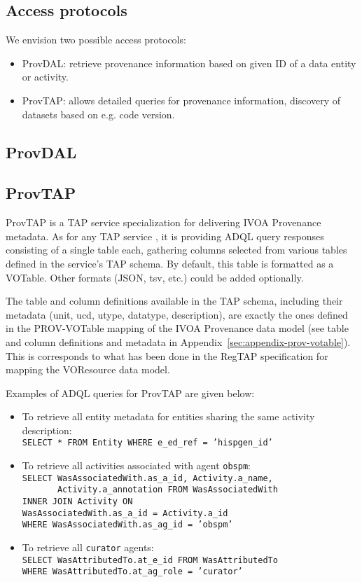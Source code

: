 \subsection{Access protocols}
\label{sec:access_protocols}
We envision two possible access protocols:
\begin{itemize}
\item ProvDAL: retrieve provenance information based on given ID of a data entity or activity.
\item ProvTAP: allows detailed queries for provenance information, discovery of datasets based on e.g. code version.
\end{itemize}

\subsection{ProvDAL}



\subsection{ProvTAP}
ProvTAP is a TAP service specialization for delivering IVOA Provenance metadata.
As for any TAP service \citep{std:TAP}, it is providing ADQL query responses
consisting of a single table each, gathering columns selected from various
tables defined in the service's TAP schema. By default, this table is formatted
as a VOTable. Other formats (JSON, tsv, etc.) could be added optionally.

The table and column definitions available in the TAP schema, including their
metadata (\attribute unit, \attribute ucd, \attribute utype, \attribute datatype, description), are exactly the ones defined
in the PROV-VOTable mapping of the IVOA Provenance data model (see table and
column definitions and metadata in Appendix~\ref{sec:appendix-prov-votable}).
This is corresponds to what has been done in the RegTAP specification
\citep{std:RegTAP} for mapping the VOResource data model.

Examples of ADQL queries for ProvTAP are given below:
\begin{itemize}
\item To retrieve all entity metadata for entities sharing the same activity description: \\  
\texttt{SELECT * FROM  Entity WHERE e\_ed\_ref = 'hispgen\_id'}
\item To retrieve all activities associated with agent \texttt{obspm}: \\
\texttt{SELECT WasAssociatedWith.as\_a\_id, Activity.a\_name, \\}
\verb!       !\texttt{Activity.a\_annotation FROM WasAssociatedWith \\
INNER JOIN Activity ON \\ WasAssociatedWith.as\_a\_id = Activity.a\_id 
\\ WHERE  WasAssociatedWith.as\_ag\_id = 'obspm'}
\item To retrieve all \texttt{curator} agents: \\
\texttt{SELECT  WasAttributedTo.at\_e\_id FROM WasAttributedTo \\
 WHERE WasAttributedTo.at\_ag\_role = 'curator'}
\end{itemize}


